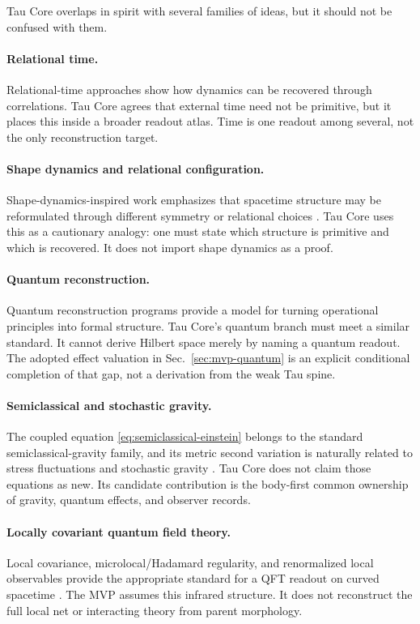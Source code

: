 \documentclass[11pt]{article}
\begin{document}
Tau Core overlaps in spirit with several families of ideas, but it should not
be confused with them.

\paragraph{Relational time.}
Relational-time approaches show how dynamics can be recovered through
correlations.  Tau Core agrees that external time need not be primitive, but it
places this inside a broader readout atlas.  Time is one readout among several,
not the only reconstruction target.

\paragraph{Shape dynamics and relational configuration.}
Shape-dynamics-inspired work emphasizes that spacetime structure may be
reformulated through different symmetry or relational choices
\cite{GomesKoslowski2012}.  Tau Core uses this as a cautionary analogy: one
must state which structure is primitive and which is recovered.  It does not
import shape dynamics as a proof.

\paragraph{Quantum reconstruction.}
Quantum reconstruction programs provide a model for turning operational
principles into formal structure.  Tau Core's quantum branch must meet a
similar standard.  It cannot derive Hilbert space merely by naming a quantum
readout.  The adopted effect valuation in Sec.~\ref{sec:mvp-quantum} is an
explicit conditional completion of that gap, not a derivation from the weak
Tau spine.

\paragraph{Semiclassical and stochastic gravity.}
The coupled equation \eqref{eq:semiclassical-einstein} belongs to the standard
semiclassical-gravity family, and its metric second variation is naturally
related to stress fluctuations and stochastic gravity
\cite{HuVerdaguer2008}.  Tau Core does not claim those equations as new.  Its
candidate contribution is the body-first common ownership of gravity, quantum
effects, and observer records.

\paragraph{Locally covariant quantum field theory.}
Local covariance, microlocal/Hadamard regularity, and renormalized local
observables provide the appropriate standard for a QFT readout on curved
spacetime \cite{BrunettiFredenhagenVerch2003,HollandsWald2001,HollandsWald2002}.
The MVP assumes this infrared structure.  It does not reconstruct the full
local net or interacting theory from parent morphology.
\end{document}
